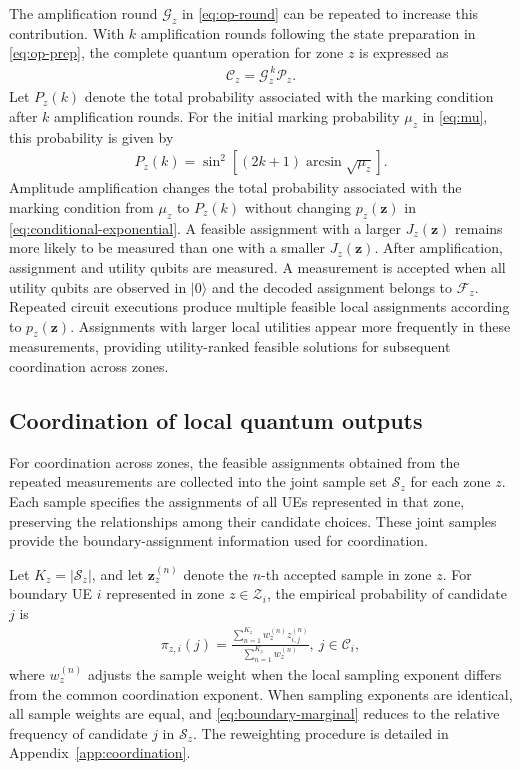 \documentclass[journal]{IEEEtran}
\newcommand{\ket}[1]{\lvert #1 \rangle}
\begin{document}
{{The amplification round $\mathcal{G}_z$ in \eqref{eq:op-round} can be repeated to increase this contribution. With $k$ amplification rounds following the state preparation in \eqref{eq:op-prep}, the complete quantum operation for zone $z$ is expressed as 
\begin{align}
\mathcal{C}_z=\mathcal{G}_z^{\,k}\mathcal{P}_z.
\label{eq:circuit-chain}
\end{align}
Let $P_z(k)$ denote the total probability associated with the marking condition after $k$ amplification rounds. For the initial marking
probability $\mu_z$ in \eqref{eq:mu}, this probability is given by
\begin{align}
P_z(k)=\sin^2\!\left[(2k+1)\arcsin\sqrt{\mu_z}\right].
\label{eq:success}
\end{align}
Amplitude amplification changes the total probability associated with the marking condition from $\mu_z$ to $P_z(k)$ without changing
$p_z(\bm z)$ in \eqref{eq:conditional-exponential}. A feasible assignment with a larger $J_z(\bm z)$ remains more likely to be
measured than one with a smaller $J_z(\bm z)$.
After amplification, assignment and utility qubits are measured. A measurement is accepted when all utility qubits are observed in
$\ket{0}$ and the decoded assignment belongs to $\mathcal{F}_z$. Repeated circuit executions produce multiple feasible local assignments according to $p_z(\bm z)$. Assignments with larger local utilities appear more frequently in these measurements, providing utility-ranked feasible solutions for subsequent coordination across zones.

\subsection{Coordination of local quantum outputs}
\label{sec:coordination}
For coordination across zones, the feasible assignments obtained from the repeated measurements are collected into the joint sample set $\mathcal{S}_z$ for each zone $z$. Each sample specifies the assignments of all UEs represented in that zone, preserving the relationships among their candidate choices. These joint samples provide the boundary-assignment information used for coordination.

Let $K_z=|\mathcal{S}_z|$, and let $\bm z_z^{(n)}$ denote the $n$-th accepted sample in zone $z$. For boundary UE $i$ represented in zone $z\in\mathcal{Z}_i$, the empirical probability of candidate $j$ is
\begin{align}
\pi_{z,i}(j)
=\frac{\sum_{n=1}^{K_z}w_z^{(n)}z_{i,j}^{(n)}}{\sum_{n=1}^{K_z}w_z^{(n)}},~ j\in\mathcal C_i,
\label{eq:boundary-marginal}
\end{align}
where $w_z^{(n)}$ adjusts the sample weight when the local sampling exponent differs from the common coordination exponent. When sampling exponents are identical, all sample weights are equal, and \eqref{eq:boundary-marginal} reduces to the relative frequency of candidate $j$ in $\mathcal{S}_z$. The reweighting procedure is detailed in Appendix~\ref{app:coordination}.

}}
\end{document}
